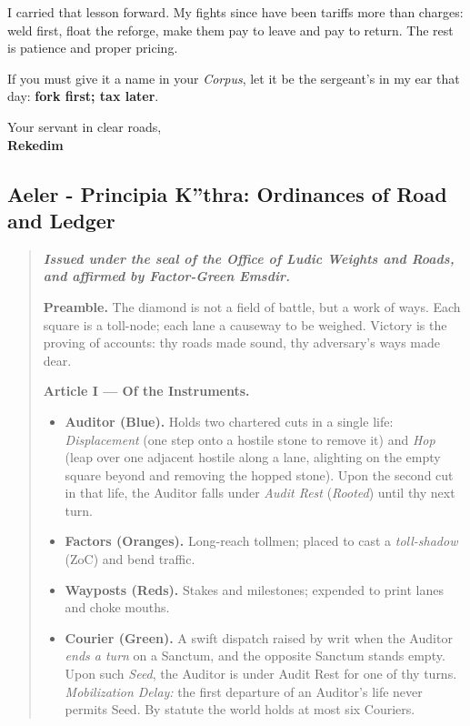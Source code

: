 \documentclass[11pt]{article}
\begin{document}
I carried that lesson forward. My fights since have been tariffs more than charges: weld first, float the reforge, make them pay to leave and pay to return. The rest is patience and proper pricing.

\medskip
\noindent If you must give it a name in your \textit{Corpus}, let it be the sergeant's in my ear that day: \textbf{fork first; tax later}.

\medskip
\noindent Your servant in clear roads,\\
\textbf{Rekedim}

\clearpage

\subsection{Aeler - Principia K''thra: Ordinances of Road and Ledger}
\begin{quote}\small\itshape
\textbf{Issued under the seal of the Office of Ludic Weights and Roads, and affirmed by Factor-Green Emsdir.}

\medskip
\textbf{Preamble.} The diamond is not a field of battle, but a work of ways. Each square is a toll-node; each lane a causeway to be weighed. Victory is the proving of accounts: thy roads made sound, thy adversary's ways made dear.

\medskip
\textbf{Article I --- Of the Instruments.}
\begin{itemize}\itemsep0.25em
  \item \textbf{Auditor (Blue).} Holds two chartered cuts in a single life: \emph{Displacement} (one step onto a hostile stone to remove it) and \emph{Hop} (leap over one adjacent hostile along a lane, alighting on the empty square beyond and removing the hopped stone). Upon the second cut in that life, the Auditor falls under \emph{Audit Rest} (\emph{Rooted}) until thy next turn.
  \item \textbf{Factors (Oranges).} Long-reach tollmen; placed to cast a \emph{toll-shadow} (ZoC) and bend traffic.
  \item \textbf{Wayposts (Reds).} Stakes and milestones; expended to print lanes and choke mouths.
  \item \textbf{Courier (Green).} A swift dispatch raised by writ when the Auditor \emph{ends a turn} on a Sanctum, and the opposite Sanctum stands empty. Upon such \emph{Seed}, the Auditor is under Audit Rest for one of thy turns. \emph{Mobilization Delay:} the first departure of an Auditor's life never permits Seed. By statute the world holds at most six Couriers.
\end{itemize}


\end{quote}
\end{document}
